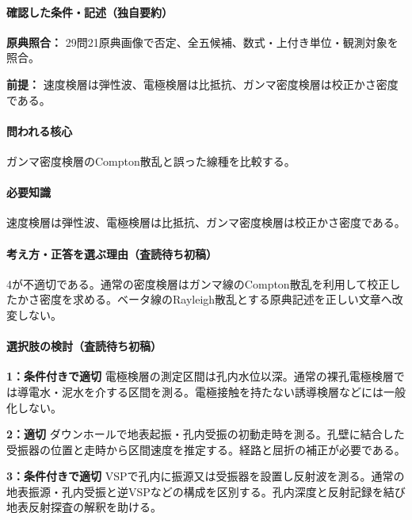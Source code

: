 \paragraph{確認した条件・記述（独自要約）}\mbox{}\par

\noindent\textbf{原典照合：} 29問21原典画像で否定、全五候補、数式・上付き単位・観測対象を照合。\par

\noindent\textbf{前提：} 速度検層は弾性波、電極検層は比抵抗、ガンマ密度検層は校正かさ密度である。\par

\paragraph{問われる核心} ガンマ密度検層のCompton散乱と誤った線種を比較する。

\paragraph{必要知識} 速度検層は弾性波、電極検層は比抵抗、ガンマ密度検層は校正かさ密度である。

\paragraph{考え方・正答を選ぶ理由（査読待ち初稿）} 4が不適切である。通常の密度検層はガンマ線のCompton散乱を利用して校正したかさ密度を求める。ベータ線のRayleigh散乱とする原典記述を正しい文章へ改変しない。

\paragraph{選択肢の検討（査読待ち初稿）}\mbox{}\par

\noindent\textbf{1：条件付きで適切} 電極検層の測定区間は孔内水位以深。通常の裸孔電極検層では導電水・泥水を介する区間を測る。電極接触を持たない誘導検層などには一般化しない。\par

\noindent\textbf{2：適切} ダウンホールで地表起振・孔内受振の初動走時を測る。孔壁に結合した受振器の位置と走時から区間速度を推定する。経路と屈折の補正が必要である。\par

\noindent\textbf{3：条件付きで適切} VSPで孔内に振源又は受振器を設置し反射波を測る。通常の地表振源・孔内受振と逆VSPなどの構成を区別する。孔内深度と反射記録を結び地表反射探査の解釈を助ける。\par

